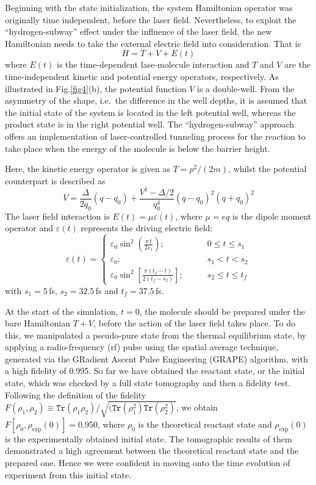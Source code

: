 \documentclass[8.5pt,twoside,twocolumn]{article}
\newcommand{\be}{\begin{equation}}
\newcommand{\ee}{\end{equation}}
\begin{document}
Beginning with the state initialization,
the system Hamiltonian operator was originally time independent,
before the laser field. Nevertheless, to exploit
the ``hydrogen-subway'' effect under the influence of the laser field,
the new Hamiltonian needs to take the external electric field
into consideration. That is
\[H = T + V + E(t)\]
where $E(t)$ is the time-dependent lase-molecule interaction
and $T$ and $V$ are the time-independent kinetic and potential energy operators, respectively.
As illustrated in Fig.\ref{fig4}(b), the potential function $V$
is a double-well.
From the asymmetry of the shape, i.e.\
the difference in the well depths, it is assumed that
the initial state of the system
is located in the left potential well,
whereas the product state
is in the right potential well.
The ``hydrogen-subway'' approach offers
an implementation of laser-controlled tunneling process
for the reaction to take place when the energy of the molecule is
below the barrier height.

Here, the kinetic energy operator is given as $T = p^{2} /(2m)$,
whilst the potential counterpart is described as
\be\label{potential}
 {V}=\frac{\Delta}{2q_0}(  q-q_0)+\frac{V^\ddag-\Delta/2}{q_0^4}(  q-q_0)^2(  q+q_0)^2
\ee
The laser field interaction is $E(t) = \mu\varepsilon(t)$,
where $\mu = eq$ is the dipole moment operator and $\varepsilon(t)$
represents the driving electric field:
\be
  \varepsilon(t)=\left\{
    \begin{array}{cc}
       \varepsilon_0\sin^2(\frac{\pi\, t}     {2s_1})         ;&\qquad   0\leq t\leq s_1\\
       \varepsilon_0                                        ;&\qquad   s_1<t<s_2\\
       \varepsilon_0\sin^2[\frac{\pi(t_{\!f}-t)}{2(t_{\!f}-s_2)}]   ;&\qquad   s_2\leq t\leq t_f
    \end{array}
  \right.
\ee
with $s_1=5\,$fs, $s_2=32.5\,$fs and $t_f=37.5\,$fs.

At the start of the simulation, $t = 0$,
the molecule should be prepared under the bare Hamiltonian $T + V$,
before the action of the laser field takes place.
To do this, we manipulated a pseudo-pure state from the
thermal equilibrium state, by applying a radio-frequency (rf)
pulse using the spatial average technique,\cite{spatial_averaging_1}
generated via the GRadient Ascent Pulse Engineering (GRAPE)
algorithm,\cite{GRAPE_1,NMR_readout,GRAPE_3} with a high fidelity of 0.995.
So far we have obtained the reactant state,
or the initial state, which was checked by a full state tomography
and then a fidelity test.
Following the definition of the fidelity $F(\rho_{1}, \rho_{2})\equiv \texttt{Tr}(\rho_1{\rho_2})/\sqrt{(\texttt{Tr}(\rho_1^2)\texttt{Tr}(\rho_2^2)}$,
we obtain $F[\rho_0, \rho_{\text{exp}}(0)]=0.950$,
where $\rho_0$ is the theoretical reactant state and
$\rho_{\text{exp}}(0)$ is the experimentally obtained initial state.
The tomographic results of them demonstrated
a high agreement between the theoretical reactant state
and the prepared one. Hence we were confident in moving onto the
time evolution of experiment from this initial state.
\end{document}
